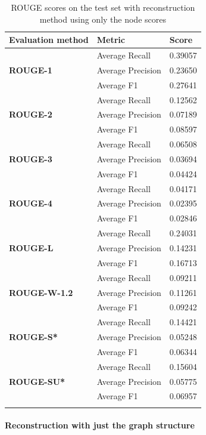 \begin{longtable}{| l | l | l |}
	\hline
	\textbf{Evaluation method}&\textbf{Metric}&\textbf{Score}\\ \hline \hline		
	\multirow{3}{*}{\textbf{ROUGE-1}}
		&Average Recall&0.39057 \\
		&Average Precision&0.23650 \\ 
		&Average F1&0.27641 \\ \hline \hline
	\multirow{3}{*}{\textbf{ROUGE-2}}
		&Average Recall&0.12562 \\
		&Average Precision&0.07189 \\
		&Average F1&0.08597 \\ \hline \hline
	\multirow{3}{*}{\textbf{ROUGE-3}}
		&Average Recall&0.06508 \\
		&Average Precision&0.03694 \\
		&Average F1&0.04424 \\ \hline \hline
	\multirow{3}{*}{\textbf{ROUGE-4}}
		&Average Recall&0.04171 \\
		&Average Precision&0.02395 \\
		&Average F1&0.02846 \\ \hline \hline
	\multirow{3}{*}{\textbf{ROUGE-L}}
		&Average Recall&0.24031 \\
		&Average Precision&0.14231 \\
		&Average F1&0.16713 \\ \hline \hline
	\multirow{3}{*}{\textbf{ROUGE-W-1.2}}
		&Average Recall&0.09211 \\
		&Average Precision&0.11261 \\
		&Average F1&0.09242 \\ \hline \hline
	\multirow{3}{*}{\textbf{ROUGE-S*}}
		&Average Recall&0.14421 \\
		&Average Precision&0.05248 \\
		&Average F1&0.06344 \\ \hline \hline
	\multirow{3}{*}{\textbf{ROUGE-SU*}}
		&Average Recall&0.15604 \\
		&Average Precision&0.05775 \\
		&Average F1&0.06957 \\ \hline
	\caption{ROUGE scores on the test set with reconstruction method using only the node scores}
\end{longtable}

\paragraph{Reconstruction with just the graph structure}

